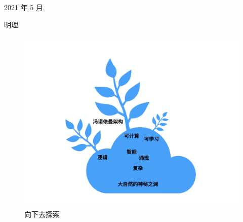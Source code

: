 \documentclass[a4paper,12pt]{article}
\begin{document}
\hfill \hfill 2021 年 5 月

\hfill \hfill 明理

\begin{figure}[ht]
\centering
\includegraphics[height=3.5in]{images/landscape.png}
\captionsetup{labelformat=empty}
\caption{向下去探索}
\end{figure}
\end{document}

